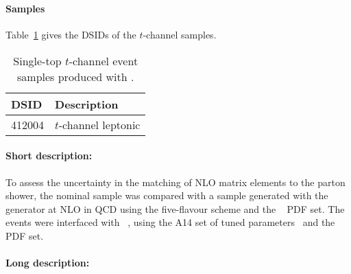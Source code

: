 \subsubsection[MadGraph5\_aMC@NLO+Pythia8]{\MGNLOPY[8]}
\label{subsubsec:tchan_aMCP8}

\paragraph{Samples}

Table~\ref{tab:tchan_aMCP8} gives the DSIDs of the $t$-channel \MGNLOPY[8] samples.
\begin{table}[htbp]
\begin{center}
\caption{Single-top $t$-channel event samples produced with \MGNLOPY[8].} 
\label{tab:tchan_aMCP8}
\begin{tabular}{ l | l }
\hline
DSID & Description \\
\hline
412004 & $t$-channel leptonic \\
\hline
\end{tabular}
\end{center}
\end{table}

\paragraph{Short description:}

To assess the uncertainty in the matching of NLO matrix elements to the
parton shower, the nominal sample was compared with a sample generated
with the \MGNLO[2.6.2] generator at NLO in QCD using the five-flavour
scheme and the \NNPDF[2.3nlo]~\cite{Ball:2014uwa} PDF set. The events were
interfaced with \PYTHIA[8.230]~\cite{Sjostrand:2014zea}, using the A14
set of tuned parameters~\cite{ATL-PHYS-PUB-2014-021} and the \NNPDF[2.3lo] PDF set.

\paragraph{Long description:}

